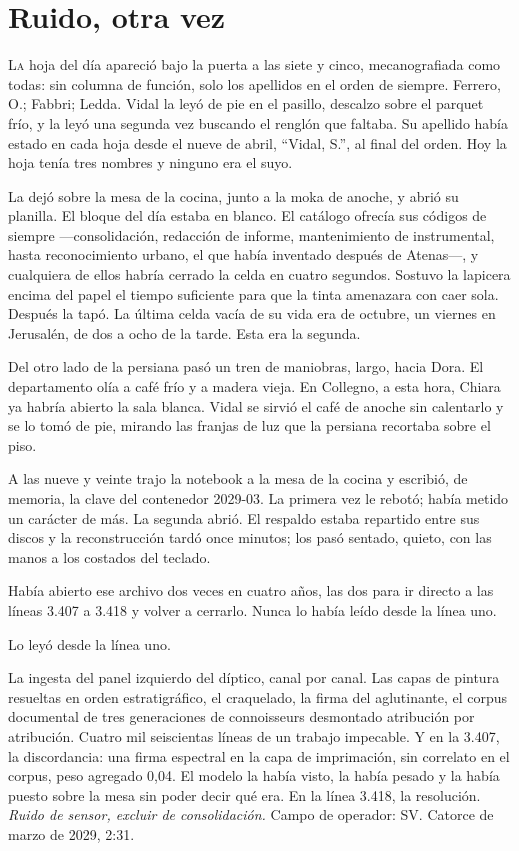 \clearpage

\chapter{Ruido, otra vez}

\lettrine[lines=2, lhang=0.1, nindent=0.2em]{L}{a} hoja del día apareció bajo la puerta a las siete y cinco, mecanografiada como todas: sin columna de función, solo los apellidos en el orden de siempre. Ferrero, O.; Fabbri; Ledda. Vidal la leyó de pie en el pasillo, descalzo sobre el parquet frío, y la leyó una segunda vez buscando el renglón que faltaba. Su apellido había estado en cada hoja desde el nueve de abril, ``Vidal, S.'', al final del orden. Hoy la hoja tenía tres nombres y ninguno era el suyo.


La dejó sobre la mesa de la cocina, junto a la moka de anoche, y abrió su planilla. El bloque del día estaba en blanco. El catálogo ofrecía sus códigos de siempre ---consolidación, redacción de informe, mantenimiento de instrumental, hasta reconocimiento urbano, el que había inventado después de Atenas---, y cualquiera de ellos habría cerrado la celda en cuatro segundos. Sostuvo la lapicera encima del papel el tiempo suficiente para que la tinta amenazara con caer sola. Después la tapó. La última celda vacía de su vida era de octubre, un viernes en Jerusalén, de dos a ocho de la tarde. Esta era la segunda.

Del otro lado de la persiana pasó un tren de maniobras, largo, hacia Dora. El departamento olía a café frío y a madera vieja. En Collegno, a esta hora, Chiara ya habría abierto la sala blanca. Vidal se sirvió el café de anoche sin calentarlo y se lo tomó de pie, mirando las franjas de luz que la persiana recortaba sobre el piso.

A las nueve y veinte trajo la notebook a la mesa de la cocina y escribió, de memoria, la clave del contenedor 2029-03. La primera vez le rebotó; había metido un carácter de más. La segunda abrió. El respaldo estaba repartido entre sus discos y la reconstrucción tardó once minutos; los pasó sentado, quieto, con las manos a los costados del teclado.

Había abierto ese archivo dos veces en cuatro años, las dos para ir directo a las líneas 3.407 a 3.418 y volver a cerrarlo. Nunca lo había leído desde la línea uno.

Lo leyó desde la línea uno.

La ingesta del panel izquierdo del díptico, canal por canal. Las capas de pintura resueltas en orden estratigráfico, el craquelado, la firma del aglutinante, el corpus documental de tres generaciones de connoisseurs desmontado atribución por atribución. Cuatro mil seiscientas líneas de un trabajo impecable. Y en la 3.407, la discordancia: una firma espectral en la capa de imprimación, sin correlato en el corpus, peso agregado 0,04. El modelo la había visto, la había pesado y la había puesto sobre la mesa sin poder decir qué era. En la línea 3.418, la resolución. \textit{Ruido de sensor, excluir de consolidación.} Campo de operador: SV. Catorce de marzo de 2029, 2:31.

